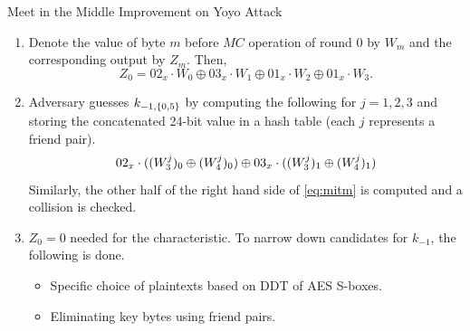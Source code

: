 \documentclass[notheorems]{beamer}
\theoremstyle{definition}
\theoremstyle{example}
\begin{document}
    \begin{frame}[<+->]{Meet in the Middle Improvement on Yoyo Attack}
        \begin{enumerate}
            \item Denote the value of byte \(m\) before \(MC\) operation of
            round 0 by \(W_m\) and the corresponding output by \(Z_m\). Then,
            \begin{equation}
                Z_0 = 02_x \cdot W_0 \oplus 03_x \cdot W_1 \oplus 01_x \cdot W_2 \oplus 01_x \cdot W_3.
                \label{eq:mitm}
            \end{equation}
            \item Adversary guesses \(k_{-1, \{0, 5\}}\) by computing the
            following for \(j = 1, 2, 3\) and storing the concatenated 24-bit
            value in a hash table (each \(j\) represents a friend pair).
            \begin{equation}
                02_x \cdot ((W_3^j)_0 \oplus (W_4^j)_0) \oplus 03_x \cdot ((W_3^j)_1 \oplus (W_4^j)_1)
                \label{eq:mitm-0-5}
            \end{equation}
            Similarly, the other half of the right hand side of \eqref{eq:mitm}
            is computed and a collision is checked.
            \item \(Z_0 = 0\) needed for the characteristic. To narrow down
            candidates for \(k_{-1}\), the following is done.
            \begin{itemize}
                \item Specific choice of plaintexts based on DDT of AES S-boxes.
                \item Eliminating key bytes using friend pairs.
            \end{itemize}
        \end{enumerate} 
    \end{frame}
\end{document}
